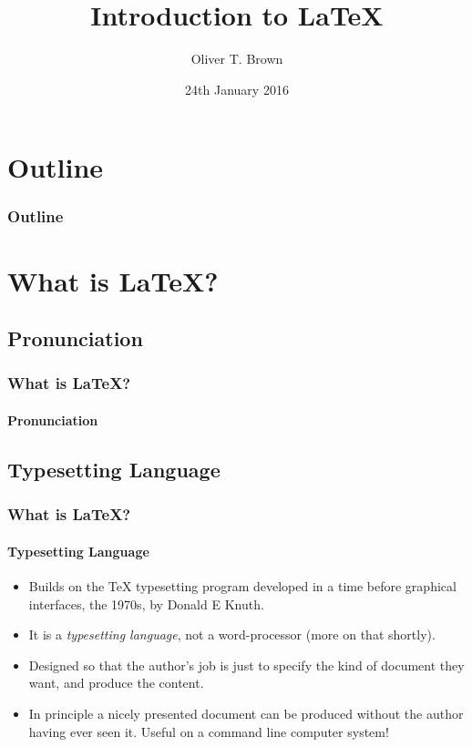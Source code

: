 \documentclass{beamer}
\title{Introduction to \LaTeX}
\author[OTB]{Oliver T. Brown}
\institute[HWU]{Heriot-Watt University}
\date[2017-01-24]{24th January 2016}
\begin{document}
\begin{frame}
	\titlepage
\end{frame}

\section{Outline}
\begin{frame}
	\frametitle{Outline}
	\tableofcontents
\end{frame}

\section{What is \LaTeX?}

\subsection[LayTECH]{Pronunciation}
\begin{frame}
\frametitle{What is \LaTeX?}
\framesubtitle{Pronunciation}
 \vspace{\baselineskip}

 \vspace{\baselineskip}

 \vspace{\baselineskip}

\end{frame}

\subsection{Typesetting Language}
\begin{frame}
\frametitle{What is \LaTeX?}
\framesubtitle{Typesetting Language}
\begin{itemize}
\item Builds on the TeX typesetting program developed in a time before graphical interfaces, the 1970s, by Donald E Knuth.
\item It is a \emph{typesetting language}, not a word-processor (more on that shortly).
\item Designed so that the author's job is just to specify the kind of document they want, and produce the content.
\item In principle a nicely presented document can be produced without the author having ever seen it. Useful on a command line computer system!
\end{itemize}
\end{frame}
\end{document}
